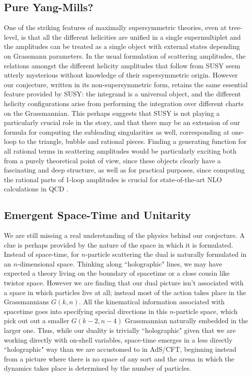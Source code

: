 \documentclass[12pt]{article}
\begin{document}
\subsection{Pure Yang-Mills?}
One of the striking features of maximally supersymmetric theories, even at tree-level, is that all the different helicities are unified in a single supermultiplet and the amplitudes can be treated as a single object with external states depending on Grassmann parameters. In the usual formulation of scattering amplitudes, the relations amongst the different helicity amplitudes that follow from SUSY seem utterly mysterious without knowledge of their supersymmetric origin. However our conjecture, written in its non-supersymmetric form, retains the same essential feature provided by SUSY: the integrand is a universal object, and the different helicity configurations arise from performing the integration over different charts on the Grassmannian. This perhaps suggests that SUSY is not playing a particularly crucial role in the story, and that there may be an extension of our formula for computing the subleading singularities as well, corresponding at one-loop to the triangle, bubble and rational pieces. Finding a generating function for all rational terms in scattering amplitudes would be particularly exciting both from a purely theoretical point of view, since these objects clearly have a fascinating and deep structure, as well as for practical purposes, since computing the rational parts of 1-loop amplitudes is crucial for state-of-the-art NLO calculations in QCD \cite{Berger:2008ag}.

\subsection{Emergent Space-Time and Unitarity}

We are still missing a real understanding of the physics behind our conjecture. A clue is perhaps provided by the nature of the space in which it is formulated. Instead of space-time, for $n$-particle scattering the dual is naturally formulated in an $n$-dimensional space. Thinking along ``holographic" lines, we may have expected a theory living on the boundary of spacetime or a close cousin like twistor space. However we are finding that our dual picture isn't associated with a space in which particles live at all; instead most of the action takes place in the Grassmannians $G(k,n)$. All the kinematical information associated with spacetime goes into specifying special directions in this $n$-particle space, which pick out out a smaller $G(k-2,n-4)$ Grassmannian naturally embedded in the larger one. Thus, while our duality is trivially ``holographic" given that we are working directly with on-shell variables, space-time emerges in a less directly ``holographic" way than we are accustomed to in AdS/CFT, beginning
instead from a picture where there is no space of any sort and the arena in which the dynamics takes place is determined by the number of particles.
\end{document}
